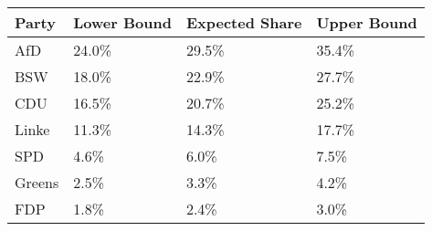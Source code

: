\begin{tabular}{llll}
  \hline
Party & Lower Bound & Expected Share & Upper Bound \\ 
  \hline
AfD & 24.0\% & 29.5\% & 35.4\% \\ 
  BSW & 18.0\% & 22.9\% & 27.7\% \\ 
  CDU & 16.5\% & 20.7\% & 25.2\% \\ 
  Linke & 11.3\% & 14.3\% & 17.7\% \\ 
  SPD & 4.6\% & 6.0\% & 7.5\% \\ 
  Greens & 2.5\% & 3.3\% & 4.2\% \\ 
  FDP & 1.8\% & 2.4\% & 3.0\% \\ 
   \hline
\end{tabular}
